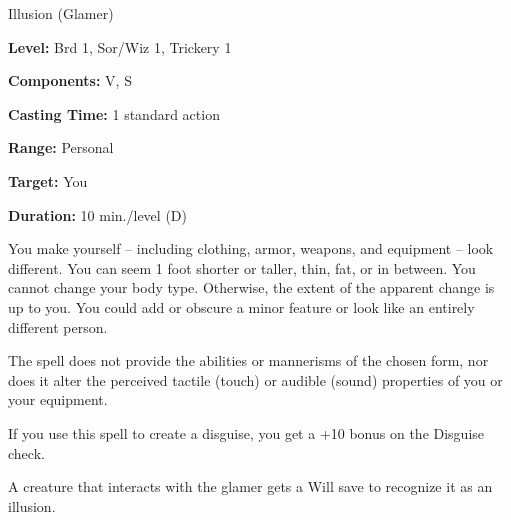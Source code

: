
Illusion (Glamer)

\textbf{Level:} Brd 1, Sor/Wiz 1, Trickery 1

\textbf{Components:} V, S

\textbf{Casting Time:} 1 standard action

\textbf{Range:} Personal

\textbf{Target:} You

\textbf{Duration:} 10 min./level (D)

You make yourself -- including clothing, armor, weapons, and equipment -- look different. 
You can seem 1 foot shorter or taller, thin, fat, or in between. You cannot change 
your body type. Otherwise, the extent of the apparent change is up to you. You 
could add or obscure a minor feature or look like an entirely different person.

The spell does not provide the abilities or mannerisms of the chosen form, nor 
does it alter the perceived tactile (touch) or audible (sound) properties of you 
or your equipment. 

If you use this spell to create a disguise, you get a +10 bonus on the Disguise 
check.

A creature that interacts with the glamer gets a Will save to recognize it as an 
illusion.

